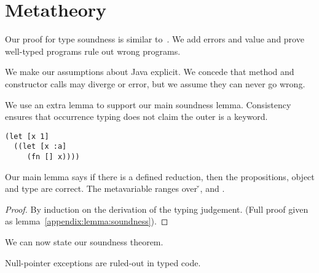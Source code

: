 \section{Metatheory}
\label{sec:metatheory}

Our proof for type soundness is similar to~\citet{TF10}. We add
errors and \wrong{} value and prove well-typed programs
rule out wrong programs.

We make our assumptions about Java explicit. We concede that
method and constructor calls may diverge or error, but we assume they can
never go wrong.

{}



We use an extra lemma to support our main soundness lemma. Consistency
ensures that occurrence typing does not claim the outer 
\x{} is a keyword. 

\begin{verbatim}
(let [x 1]
  ((let [x :a]
     (fn [] x))))
\end{verbatim}

{}

Our main lemma says if there is a defined reduction, then the propositions, object
and type are correct.
The metavariable  ranges over \v{}, \errorvalv{} and \wrong{}.

\begin{lemma}\label{main:lemma:soundness}

  {\soundnesslemmahypothesis}
  \begin{proof}
    By induction on the derivation of the typing judgement. 
    (Full proof given as lemma~\ref{appendix:lemma:soundness}).
  \end{proof}
\end{lemma}


We can now state our soundness theorem.

{}

{}

Null-pointer exceptions are ruled-out in typed code.

{}

